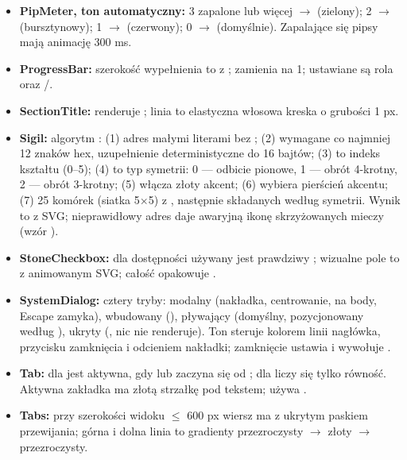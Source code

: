 \begin{itemize}[nosep]
  \item \textbf{PipMeter, ton automatyczny:} 3 zapalone lub więcej $\rightarrow$  (zielony); 2
        $\rightarrow$  (bursztynowy); 1 $\rightarrow$  (czerwony); 0 $\rightarrow$
         (domyślnie). Zapalające się pipsy mają animację  300 ms.
  \item \textbf{ProgressBar:} szerokość wypełnienia to  z
        ;  zamienia  na 1; ustawiane są rola
         oraz /.
  \item \textbf{SectionTitle:} renderuje ; linia to elastyczna włosowa kreska
        o grubości 1 px.
  \item \textbf{Sigil:} algorytm : (1) adres małymi literami bez ; (2) wymagane co
        najmniej 12 znaków hex, uzupełnienie deterministyczne do 16 bajtów; (3)  to indeks
        kształtu (0--5); (4)  to typ symetrii: 0 --- odbicie pionowe, 1 --- obrót
        4-krotny, 2 --- obrót 3-krotny; (5)  włącza złoty akcent; (6)
         wybiera pierścień akcentu; (7) 25 komórek (siatka 5$\times$5) z
        , następnie składanych według symetrii. Wynik to
         z SVG; nieprawidłowy adres daje awaryjną
        ikonę skrzyżowanych mieczy (wzór ).
  \item \textbf{StoneCheckbox:} dla dostępności używany jest prawdziwy ;
        wizualne pole to  z animowanym SVG; całość opakowuje .
  \item \textbf{SystemDialog:} cztery tryby: modalny (nakładka, centrowanie,  na body,
        Escape zamyka), wbudowany (), pływający (domyślny, pozycjonowany według ),
        ukryty (, nic nie renderuje). Ton steruje kolorem linii nagłówka, przycisku zamknięcia
        i odcieniem nakładki; zamknięcie ustawia  i wywołuje .
  \item \textbf{Tab:} dla  jest aktywna, gdy  lub zaczyna się
        od ; dla  liczy się tylko równość. Aktywna zakładka ma złotą strzałkę pod
        tekstem; używa .
  \item \textbf{Tabs:} przy szerokości widoku $\le$ 600 px wiersz ma  z ukrytym paskiem
        przewijania; górna i dolna linia to gradienty przezroczysty $\rightarrow$ złoty $\rightarrow$ przezroczysty.
\end{itemize}

